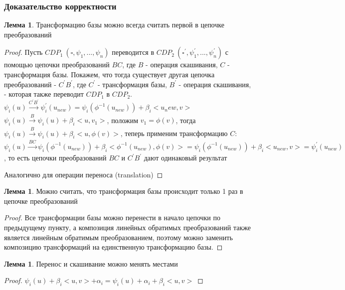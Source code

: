 \documentclass[16pt]{article}
\theoremstyle{definition}
\newtheorem{lemma}[theorem]{Лемма}
\begin{document}
\subsubsection{Доказательство корректности}

\begin{lemma}
\label{transform_is_first}
	Трансформацию базы можно всегда считать первой в цепочке преобразований
\end{lemma}
\begin{proof}
	Пусть $CDP_1\ (\square, \psi_1, ..., \psi_n)$ переводится в $CDP_2\ (\square^{'}, \psi_1^{'}, ..., \psi_n^{'})$ с помощью цепочки преобразований $BC$, где $B$ - операция скашивания, $C$ - трансформация базы. Покажем, что тогда существует другая цепочка преобразований - $C^{'}B^{'}$, где  $C^{'}$ - трансформация базы, $B^{'}$ - операция скашивания, - которая также переводит $CDP_1$ в $CDP_2$.
\\
$\psi_i(u) \xrightarrow[]{C^{'}B^{'}} \psi_i^{'}(u_{new}) = \psi_i(\phi^{-1}(u_{new})) + \beta_i<u_new, v>$
\\
$\psi_i(u) \xrightarrow[]{B} \psi_i(u) + \beta_i<u, v_1>$, положим $v_1 = \phi(v)$, тогда $\psi_i(u) \xrightarrow[]{B} \psi_i(u) + \beta_i<u, \phi(v)>$, теперь применим трансформацию $C$: 
$\psi_i(u) \xrightarrow[]{BC} \psi_i(\phi^{-1}(u_{new})) + \beta_i<\phi^{-1}(u_{new}), \phi(v)> = \psi_i(\phi^{-1}(u_{new})) + \beta_i<u_{new}, v> = \psi_i^{'}(u_{new})$, то есть цепочки преобразований $BC$ и $C^{'}B^{'}$ дают одинаковый результат

Аналогично для операции переноса (translation)
\end{proof}

\begin{lemma}
Можно считать, что трансформация базы происходит только 1 раз в цепочке преобразований
\end{lemma}
\begin{proof}
	Все трансформации базы можно перенести в начало цепочки по предыдущему пункту, а композиция линейных обратимых преобразований также является линейным обратимым преобразованием, поэтому можно заменить композицию трансформаций на единственную трансформацию базы.

\end{proof}

\begin{lemma}
	Перенос и скашивание можно менять местами
\end{lemma}
\begin{proof}
	$\psi_i(u) + \beta_i<u, v> + \alpha_i = \psi_i(u) + \alpha_i + \beta_i<u, v>$
\end{proof}
\end{document}
